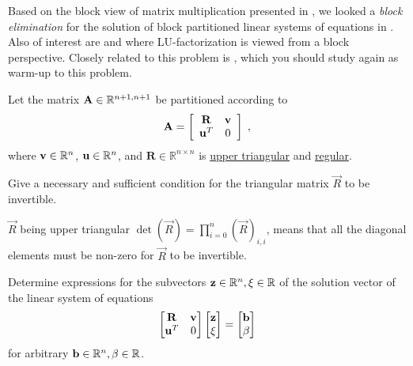 
\begin{problem} \label{prb:PartitionedMatrix}

Based on the block view of matrix multiplication presented in ,
we looked a \emph{block elimination} for the solution of block partitioned linear
systems of equations in . Also of interest are  and
 where LU-factorization is viewed from a block perspective. 
Closely related to this problem is , which you should study
again as warm-up to this problem. 

Let the matrix ${\mathbf{A}}\in\mathbb{R}^{n+1,n+1}$ be partitioned according to
\begin{align} \label{eq:block_matrix_lu}
\mathbf{A}=\left[
    \begin{array}{ccccccc}
      \mathbf{R}&{\mathbf{v}}\\
      {\mathbf{u}}^{T}&0
    \end{array}\right]\;,
\end{align}
where ${\mathbf{v}}\in\mathbb{R}^{n}$, ${\mathbf{u}}\in\mathbb{R}^{n}$, and
$\mathbf{R}\in\mathbb{R}^{n\times n}$ is \underline{upper triangular} and \underline{regular}.

\begin{subproblem}[1] \label{subprb:PartitionedMatrix_a}
  Give a necessary and sufficient condition for the triangular matrix $\vec{R}$ to be invertible.
  
  \begin{solution}
   $\vec{R}$ being upper triangular $\det (\vec{R}) = \prod_{i = 0}^n (\vec{R})_{i,i}$, means that all the diagonal elements must be non-zero for $\vec{R}$ to be invertible.
  \end{solution}

\end{subproblem}

\begin{subproblem}[2] \label{subprb:PartitionedMatrix_b}
  Determine expressions for the subvectors $\mathbf{z} \in \mathbb{R}^n, \xi \in \mathbb{R}$ of the solution vector of the linear system of equations
  \begin{align*}
   \begin{bmatrix}
      \mathbf{R} & {\mathbf{v}}\\
      {\mathbf{u}}^{T}  & 0 
   \end{bmatrix} \begin{bmatrix} \mathbf{z} \\ \xi \end{bmatrix} = \begin{bmatrix} \mathbf{b} \\ \beta \end{bmatrix}
  \end{align*}
  for arbitrary $\mathbf{b} \in \mathbb{R}^n, \beta \in \mathbb{R}$.


\end{subproblem}
\end{problem}
